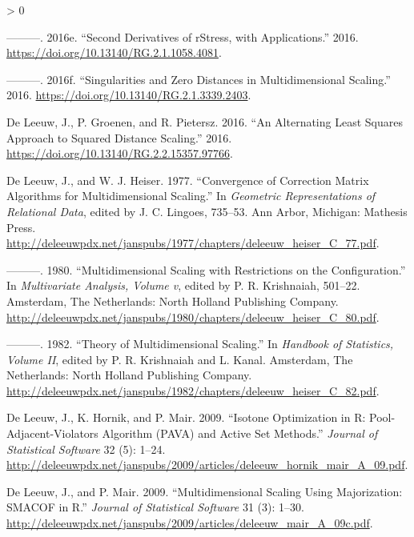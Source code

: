 \documentclass[
  12pt,
]{book}
\newlength{\cslhangindent}
\newenvironment{CSLReferences}[2] %
 {%
  \setlength{\parindent}{0pt}
  \ifodd #1 \everypar{\setlength{\hangindent}{\cslhangindent}}\ignorespaces\fi
  \ifnum #2 > 0
  \setlength{\parskip}{#2\baselineskip}
  \fi
 }%
 {}
\theoremstyle{definition}
\theoremstyle{definition}
\theoremstyle{definition}
\theoremstyle{definition}
\theoremstyle{remark}
\begin{document}
\begin{CSLReferences}{1}{0}
\leavevmode\hypertarget{ref-deleeuw_groenen_mair_E_16c}{}%
---------. 2016e. {``{Second Derivatives of rStress, with Applications}.''} 2016. \url{https://doi.org/10.13140/RG.2.1.1058.4081}.

\leavevmode\hypertarget{ref-deleeuw_groenen_mair_E_16g}{}%
---------. 2016f. {``Singularities and Zero Distances in Multidimensional Scaling.''} 2016. \url{https://doi.org/10.13140/RG.2.1.3339.2403}.

\leavevmode\hypertarget{ref-deleeuw_groenen_pietersz_E_16m}{}%
De Leeuw, J., P. Groenen, and R. Pietersz. 2016. {``An Alternating Least Squares Approach to Squared Distance Scaling.''} 2016. \url{https://doi.org/10.13140/RG.2.2.15357.97766}.

\leavevmode\hypertarget{ref-deleeuw_heiser_C_77}{}%
De Leeuw, J., and W. J. Heiser. 1977. {``Convergence of Correction Matrix Algorithms for Multidimensional Scaling.''} In \emph{Geometric Representations of Relational Data}, edited by J. C. Lingoes, 735--53. Ann Arbor, Michigan: Mathesis Press. \url{http://deleeuwpdx.net/janspubs/1977/chapters/deleeuw_heiser_C_77.pdf}.

\leavevmode\hypertarget{ref-deleeuw_heiser_C_80}{}%
---------. 1980. {``Multidimensional Scaling with Restrictions on the Configuration.''} In \emph{Multivariate Analysis, Volume v}, edited by P. R. Krishnaiah, 501--22. Amsterdam, The Netherlands: North Holland Publishing Company. \url{http://deleeuwpdx.net/janspubs/1980/chapters/deleeuw_heiser_C_80.pdf}.

\leavevmode\hypertarget{ref-deleeuw_heiser_C_82}{}%
---------. 1982. {``Theory of Multidimensional Scaling.''} In \emph{Handbook of Statistics, Volume II}, edited by P. R. Krishnaiah and L. Kanal. Amsterdam, The Netherlands: North Holland Publishing Company. \url{http://deleeuwpdx.net/janspubs/1982/chapters/deleeuw_heiser_C_82.pdf}.

\leavevmode\hypertarget{ref-deleeuw_hornik_mair_A_09}{}%
De Leeuw, J., K. Hornik, and P. Mair. 2009. {``{Isotone Optimization in R: Pool-Adjacent-Violators Algorithm (PAVA) and Active Set Methods}.''} \emph{Journal of Statistical Software} 32 (5): 1--24. \url{http://deleeuwpdx.net/janspubs/2009/articles/deleeuw_hornik_mair_A_09.pdf}.

\leavevmode\hypertarget{ref-deleeuw_mair_A_09c}{}%
De Leeuw, J., and P. Mair. 2009. {``{Multidimensional Scaling Using Majorization: SMACOF in R}.''} \emph{Journal of Statistical Software} 31 (3): 1--30. \url{http://deleeuwpdx.net/janspubs/2009/articles/deleeuw_mair_A_09c.pdf}.


\end{CSLReferences}
\end{document}
